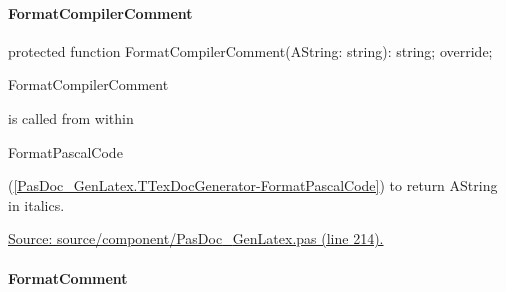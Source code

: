 \documentclass{report}
\newif\ifpdf
\begin{document}
\paragraph*{FormatCompilerComment}\hspace*{\fill}

\label{PasDoc_GenLatex.TTexDocGenerator-FormatCompilerComment}
\begin{list}{}{
\setlength{\itemindent}{0cm}
\setlength{\listparindent}{0cm}
\setlength{\leftmargin}{\evensidemargin}
\addtolength{\leftmargin}{\tmplength}
\settowidth{\labelsep}{X}
\addtolength{\leftmargin}{\labelsep}
\setlength{\labelwidth}{\tmplength}
}
\item[\textbf{Declaration}\hfill]
\ifpdf
\begin{flushleft}
\fi
\begin{ttfamily}
protected function FormatCompilerComment(AString: string): string; override;\end{ttfamily}

\ifpdf
\end{flushleft}
\fi

\par
\item[\textbf{Description}]
\begin{ttfamily}FormatCompilerComment\end{ttfamily} is called from within \begin{ttfamily}FormatPascalCode\end{ttfamily}(\ref{PasDoc_GenLatex.TTexDocGenerator-FormatPascalCode}) to return AString in italics.\par
\href{https://github.com/pasdoc/pasdoc/blob/master/source/component/PasDoc_GenLatex.pas#L214}{Source: source/component/PasDoc{\_}GenLatex.pas (line 214).}

\end{list}
\paragraph*{FormatComment}\hspace*{\fill}
\end{document}
